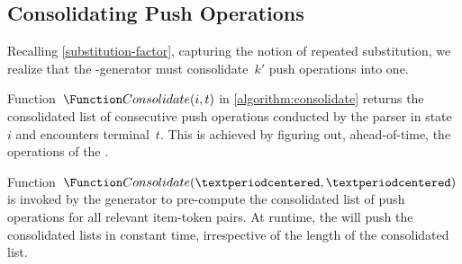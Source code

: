 \subsection{Consolidating Push Operations}
\label{subsection:consolidate}
Recalling \cref{substitution-factor}, capturing the notion of
repeated substitution, we realize that the \RLLp-generator
must consolidate~$k'$ push operations into one.

Function~$\Function Consolidate(i,t)$ in \cref{algorithm:consolidate}
returns the consolidated list of consecutive push operations conducted
by the \RLLp parser in state~$i$ and encounters terminal~$t$.
This is achieved by figuring out, ahead-of-time,
the operations of the \LLp.

Function~$\Function Consolidate(·,·)$ is invoked by the \RLLp generator to
pre-compute the consolidated list of push operations for all relevant
item-token pairs. At runtime, the \RLLp will push the consolidated lists in
constant time, irrespective of the length of the consolidated list.

